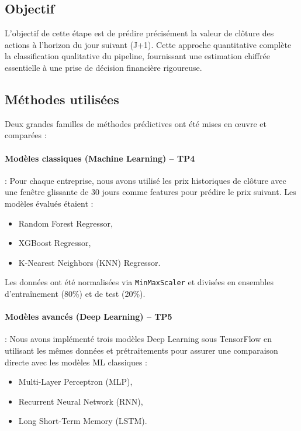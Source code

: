\documentclass[a4paper,12pt]{article}
\begin{document}
\subsection*{Objectif}

L’objectif de cette étape est de prédire précisément la valeur de clôture des actions à l'horizon du jour suivant (J+1). Cette approche quantitative complète la classification qualitative du pipeline, fournissant une estimation chiffrée essentielle à une prise de décision financière rigoureuse.

\subsection*{Méthodes utilisées}

Deux grandes familles de méthodes prédictives ont été mises en œuvre et comparées : 

\paragraph{Modèles classiques (Machine Learning) – TP4} :  
Pour chaque entreprise, nous avons utilisé les prix historiques de clôture avec une fenêtre glissante de 30 jours comme features pour prédire le prix suivant. Les modèles évalués étaient :

\begin{itemize}
    \item Random Forest Regressor,
    \item XGBoost Regressor,
    \item K-Nearest Neighbors (KNN) Regressor.
\end{itemize}

Les données ont été normalisées via \texttt{MinMaxScaler} et divisées en ensembles d'entraînement (80\%) et de test (20\%).

\paragraph{Modèles avancés (Deep Learning) – TP5} :  
Nous avons implémenté trois modèles Deep Learning sous TensorFlow en utilisant les mêmes données et prétraitements pour assurer une comparaison directe avec les modèles ML classiques :

\begin{itemize}
    \item Multi-Layer Perceptron (MLP),
    \item Recurrent Neural Network (RNN),
    \item Long Short-Term Memory (LSTM).
\end{itemize}
\end{document}
